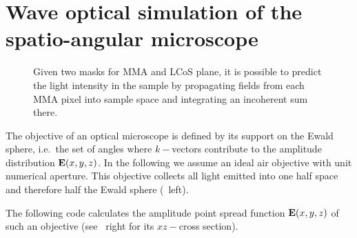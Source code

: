 \chapter{Wave optical simulation of the spatio-angular microscope}
\label{sec:sim-angle}
\begin{figure}[!hbt]
  \centering
  \def\svgscale{1.5}
  
  \caption{Given two masks for MMA and LCoS plane, it is possible to
    predict the light intensity in the sample by propagating fields
    from each MMA pixel into sample space and integrating an
    incoherent sum there.}
  \label{fig:memi-simple2-app}
\end{figure}
The objective of an optical microscope is defined by its support on
the Ewald sphere, i.e.\ the set of angles where $k-$vectors contribute
to the amplitude distribution $\mathbf{E}(x,y,z)$. In the following we
assume an ideal air objective with unit numerical aperture. This
objective collects all light emitted into one half space and therefore
half the Ewald sphere (~left).

The following code calculates the amplitude point spread function
$\mathbf{E}(x,y,z)$ of such an objective (see
~right for its $xz-$cross section).

